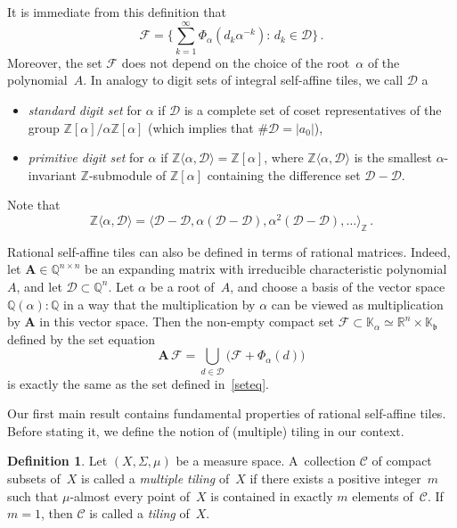 \documentclass[12pt]{amsart}
\theoremstyle{definition}
\newtheorem{definition}{Definition}
\theoremstyle{remark}
\numberwithin{equation}{section}
\begin{document}
It is immediate from this definition that
\[
\mathcal{F} = \bigg\{\sum_{k=1}^\infty \Phi_\alpha(d_k \alpha^{-k}):\, d_k \in \mathcal{D}\bigg\}\,.
\]
Moreover, the set $\mathcal{F}$ does not depend on the choice of the root~$\alpha$ of the polynomial~$A$.
In analogy to digit sets of integral self-affine tiles, we call $\mathcal{D}$ a
\begin{itemize}
\itemsep3pt
\item \emph{standard digit set} for $\alpha$ if $\mathcal{D}$ is a complete set of coset representatives of the group $\mathbb{Z}[\alpha] / \alpha \mathbb{Z}[\alpha]$ (which implies that $\# \mathcal{D} = |a_0|$), 
\item
\emph{primitive digit set} for $\alpha$ if $\mathbb{Z}\langle \alpha, \mathcal{D}\rangle = \mathbb{Z}[\alpha]$, where $\mathbb{Z}\langle \alpha, \mathcal{D}\rangle$ is the smallest $\alpha$-invariant $\mathbb{Z}$-submodule of $\mathbb{Z}[\alpha]$ containing the difference set $\mathcal{D} - \mathcal{D}$.
\end{itemize}
Note that
\[
\mathbb{Z}\langle \alpha, \mathcal{D}\rangle = \big\langle \mathcal{D} - \mathcal{D}, \alpha (\mathcal{D} - \mathcal{D}), \alpha^2 (\mathcal{D} - \mathcal{D}), \ldots\big\rangle_{\mathbb{Z}}\,.
\]

Rational self-affine tiles can also be defined in terms of rational matrices.
Indeed, let $\mathbf{A} \in \mathbb{Q}^{n\times n}$ be an expanding matrix with irreducible characteristic polynomial~$A$, and let $\mathcal{D} \subset \mathbb{Q}^{n}$. 
Let $\alpha$ be a root of~$A$, and choose a basis of the vector space $\mathbb{Q}(\alpha):\mathbb{Q}$ in a way that the multiplication by $\alpha$ can be viewed as multiplication by $\mathbf{A}$ in this vector space.
Then the non-empty compact set $\mathcal{F} \subset \mathbb{K}_\alpha \simeq \mathbb{R}^n \times \mathbb{K}_\mathfrak{b}$ defined by the set equation
\[
\mathbf{A}\, \mathcal{F} = \bigcup_{d\in \mathcal{D}} \big(\mathcal{F} + \Phi_\alpha(d)\big)
\]
is exactly the same as the set defined in~\eqref{seteq}.

Our first main result contains fundamental properties of rational self-affine tiles.
Before stating it, we define the notion of (multiple) tiling in our context. 

\begin{definition}
Let $(X,\Sigma,\mu)$ be a measure space. 
A~collection $\mathcal{C}$ of compact subsets of~$X$ is called a \emph{multiple tiling} of~$X$ if there exists a positive integer~$m$ such that $\mu$-almost every point of~$X$ is contained in exactly $m$ elements of~$\mathcal{C}$. 
If $m=1$, then $\mathcal{C}$ is called a \emph{tiling} of~$X$.
\end{definition}
\end{document}
